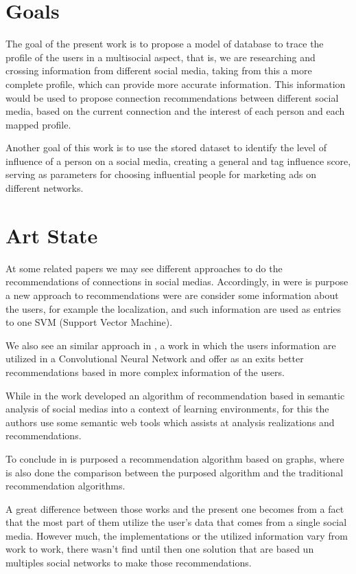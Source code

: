 \section{Goals}

The goal of the present work is to propose a model of database to trace the profile of the users in a multisocial aspect, that is, we are researching and crossing information from different social media, taking from this a more complete profile, which can provide more accurate information. This information would be used to propose connection recommendations between different social media, based on the current connection and the interest of each person and each mapped profile.

Another goal of this work is to use the stored dataset to identify the level of influence of a person on a social media, creating a general and tag influence score, serving as parameters for choosing influential people for marketing ads on different networks.


\section{Art State}

At some related papers we may see different approaches to do the recommendations of connections in social medias. Accordingly, in \cite{multi-feature-recommendation} were is purpose a new approach to recommendations were are consider some information about the users, for example the localization, and such information are used as entries to one SVM (Support Vector Machine).

We also see an similar approach in \cite{convolutional-network}, a work in which the users information are utilized in a Convolutional Neural Network and offer as an exits better recommendations based in more complex information of the users.

While in \cite{semantic-analysis-recommendation} the work developed an algorithm of recommendation based in semantic analysis of social medias into a context of learning environments, for this the authors use some semantic web tools which assists at analysis realizations and recommendations. 

To conclude in \cite{prediction-social-network} is purposed a recommendation algorithm based on graphs, where is also done the comparison between the purposed algorithm and the traditional recommendation algorithms. 

A great difference between those works and the present one becomes from a fact that the most part of them utilize the user’s data that comes from a single social media. However much, the implementations or the utilized information vary from work to work, there wasn’t find until then one solution that are based un multiples social networks to make those recommendations. 
